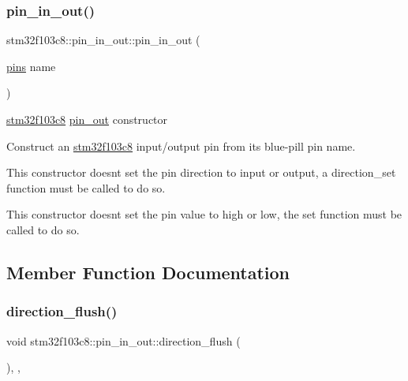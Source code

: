 \subsubsection{\texorpdfstring{pin\+\_\+in\+\_\+out()}{pin\_in\_out()}\hspace{0.1cm}{\footnotesize\ttfamily [2/2]}}
{\footnotesize\ttfamily stm32f103c8\+::pin\+\_\+in\+\_\+out\+::pin\+\_\+in\+\_\+out (\begin{DoxyParamCaption}\item[{\hyperlink{namespacestm32f103c8_a69d642506db309a7e64295d35ec21ff6}{pins}}]{name }\end{DoxyParamCaption})\hspace{0.3cm}{\ttfamily [inline]}}

\hyperlink{namespacestm32f103c8}{stm32f103c8} \hyperlink{classstm32f103c8_1_1pin__out}{pin\+\_\+out} constructor

Construct an \hyperlink{namespacestm32f103c8}{stm32f103c8} input/output pin from its blue-\/pill pin name.

This constructor doesn\textquotesingle{}t set the pin direction to input or output, a direction\+\_\+set function must be called to do so.

This constructor doesn\textquotesingle{}t set the pin value to high or low, the set function must be called to do so. 

\subsection{Member Function Documentation}
\mbox{\label{classstm32f103c8_1_1pin__in__out_ab174d020536c2572ac5a0875ed8af10e}} 
\subsubsection{\texorpdfstring{direction\+\_\+flush()}{direction\_flush()}}
{\footnotesize\ttfamily void stm32f103c8\+::pin\+\_\+in\+\_\+out\+::direction\+\_\+flush (\begin{DoxyParamCaption}{ }\end{DoxyParamCaption})\hspace{0.3cm}{\ttfamily [inline]}, {\ttfamily [override]}, {\ttfamily [virtual]}}

